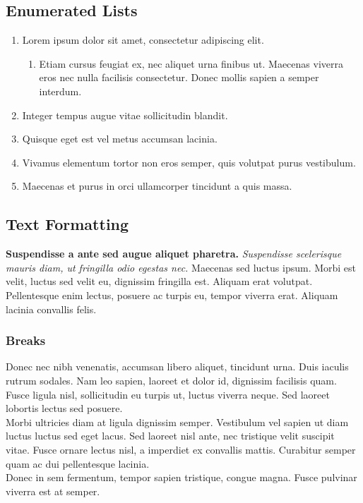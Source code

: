 \documentclass{article}
\begin{document}
\subsection{Enumerated Lists}
\begin{enumerate}
    \item Lorem ipsum dolor sit amet, consectetur adipiscing elit.
    \begin{enumerate}
        \item Etiam cursus feugiat ex, nec aliquet urna finibus ut. Maecenas viverra eros nec nulla facilisis consectetur. Donec mollis sapien a semper interdum.
    \end{enumerate}
    \item Integer tempus augue vitae sollicitudin blandit.
    \item Quisque eget est vel metus accumsan lacinia.
    \item Vivamus elementum tortor non eros semper, quis volutpat purus vestibulum.
    \item Maecenas et purus in orci ullamcorper tincidunt a quis massa.
\end{enumerate}

\subsection{Text Formatting}
\textbf{Suspendisse a ante sed augue aliquet pharetra.} \textit{Suspendisse scelerisque mauris diam, ut fringilla odio egestas nec.} Maecenas sed luctus ipsum. Morbi est velit, luctus sed velit eu, dignissim fringilla est. Aliquam erat volutpat. Pellentesque enim lectus, posuere ac turpis eu, tempor viverra erat. Aliquam lacinia convallis felis.

\subsubsection{Breaks}
Donec nec nibh venenatis, accumsan libero aliquet, tincidunt urna. Duis iaculis rutrum sodales. Nam leo sapien, laoreet et dolor id, dignissim facilisis quam. Fusce ligula nisl, sollicitudin eu turpis ut, luctus viverra neque. Sed laoreet lobortis lectus sed posuere.\\
Morbi ultricies diam at ligula dignissim semper. Vestibulum vel sapien ut diam luctus luctus sed eget lacus. Sed laoreet nisl ante, nec tristique velit suscipit vitae. Fusce ornare lectus nisl, a imperdiet ex convallis mattis. Curabitur semper quam ac dui pellentesque lacinia.\\
Donec in sem fermentum, tempor sapien tristique, congue magna. Fusce pulvinar viverra est at semper.
\end{document}
